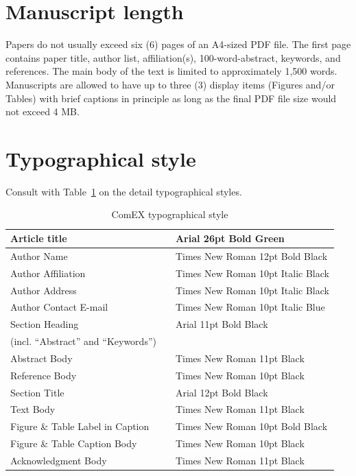 \documentclass{comex}
\begin{document}
\section{Manuscript length}

Papers do not usually exceed six (6) pages of an A4-sized PDF file. The
first page contains paper title, author list, affiliation(s),
100-word-abstract, keywords, and references.  The main body of the text
is limited to approximately 1,500 words. Manuscripts are allowed to have
up to three (3) display items (Figures and/or Tables) with brief
captions in principle as long as the final PDF file size would not
exceed 4 MB. 

\section{Typographical style}

Consult with Table~\ref{tab:style} on the detail typographical styles.

\begin{table}[ht]
\begin{center}
\caption{ComEX typographical style} \label{tab:style}
\begin{small}
\begin{tabular}{lcl}
\hline
Article title & \quad &  Arial 26pt Bold Green\\
\hline
Author Name & \quad & Times New Roman 12pt Bold Black\\
\hline
Author Affiliation & \quad & Times New Roman 10pt Italic Black\\
\hline
Author Address & \quad & Times New Roman 10pt Italic Black\\
\hline
Author Contact E-mail & \quad & Times New Roman 10pt Italic Blue\\
\hline
Section Heading & \quad & Arial 11pt Bold Black\\
(incl. ``Abstract'' and ``Keywords'') & & \\
\hline
Abstract Body & \quad & Times New Roman 11pt Black\\
\hline
Reference Body & \quad & Times New Roman 10pt Black\\
\hline
Section Title & \quad & Arial 12pt Bold Black\\
\hline
Text Body & \quad & Times New Roman 11pt Black\\
\hline
Figure \& Table Label in Caption & \quad & Times New Roman 10pt Bold Black\\
\hline
Figure \& Table Caption Body & \quad & Times New Roman 10pt Black\\
\hline
Acknowledgment Body & \quad & Times New Roman 11pt Black\\
\hline
\end{tabular}
\end{small}
\end{center}
\end{table}
\end{document}
